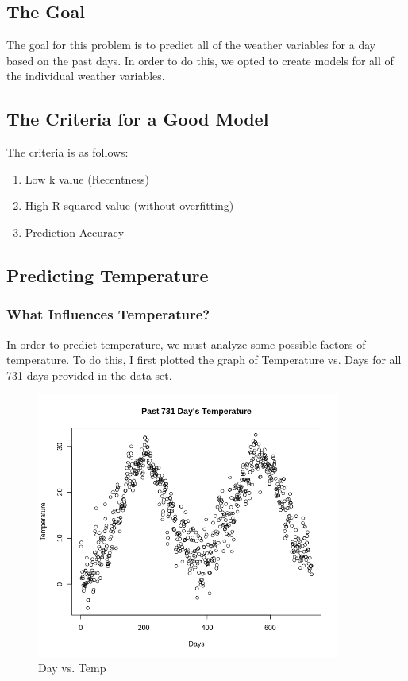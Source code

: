 \documentclass[12pt]{article}
\begin{document}
\subsection{The Goal} \label{goal}
The goal for this problem is to predict all of the weather variables for a day based on the past days. In order to do this, we opted to create models for all of the individual weather variables.

\subsection{The Criteria for a Good Model} \label{criteria}
The criteria is as follows:
\begin{enumerate}
	\item Low k value (Recentness) 
	\item High R-squared value (without overfitting)
	\item Prediction Accuracy
\end{enumerate}
	
\subsection{Predicting Temperature} \label{predictingtemp}
\subsubsection{What Influences Temperature?} \label{temp_params}
In order to predict temperature, we must analyze some possible factors of temperature. To do this, I first plotted the graph of Temperature vs. Days for all 731 days provided in the data set.
\begin{figure}[H]
	\centering
  	\includegraphics[width=100mm]{dayvstemp.png}
 	\caption{Day vs. Temp}
 	\label{fig:dayvstemp}
\end{figure}
\end{document}
